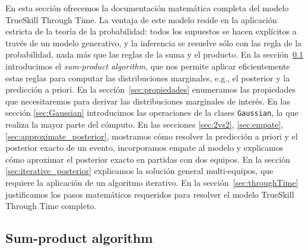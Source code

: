 \documentclass[a4paper,11pt]{book}
\theoremstyle{definition}
\begin{document}
En esta secci\'on ofrecemos la documentaci\'on matem\'atica completa del modelo TrueSkill Through Time.
%
La ventaja de este modelo reside en la aplicaci\'on estricta de la teor\'ia de la probabilidad: todos los supuestos se hacen expl\'icitos a trav\'es de un modelo generativo, y la inferencia se resuelve s\'olo con las regla de la probabilidad, nada m\'as que las reglas de la suma y el producto.
%
En la secci\'on~\ref{sec:sumProductAlgorithm} introducimos el \emph{sum-product algorithm}, que nos permite aplicar eficientemente estas reglas para computar las distribuciones marginales, e.g., el posterior y la predicci\'on a priori.
%
En la secci\'on~\ref{sec:propiedades} enumeramos las propiedades que necesitaremos para derivar las distribuciones marginales de inter\'es.
%
En las secci\'on \ref{sec:Gaussian} introducimos las operaciones de la clases \texttt{Gaussian}, la que realiza la mayor parte del c\'omputo.
%
En las secciones \ref{sec:2vs2}, \ref{sec:empate}, \ref{sec:approximate_posterior}, mostramos c\'omo resolver la predicci\'on a priori y el posterior exacto de un evento, incorporamos empate al modelo y explicamos c\'omo aproximar el posterior exacto en partidas con dos equipos.
%
En la secci\'on \ref{sec:iterative_posterior} explicamos la soluci\'on general multi-equipos, que requiere la aplicaci\'on de un algoritmo iterativo.
%
En la secci\'on~\ref{sec:throughTime} justificamos los pasos matem\'aticos requeridos para resolver el modelo TrueSkill Through Time completo.


\subsection{Sum-product algorithm} \label{sec:sumProductAlgorithm}
\end{document}
